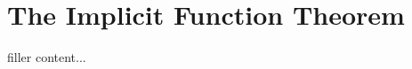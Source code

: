 \documentclass[../../templates/section]{subfiles}
\begin{document}
\section{The Implicit Function Theorem}\label{sec:the-implicit-function-theorem}

filler content...
\end{document}
